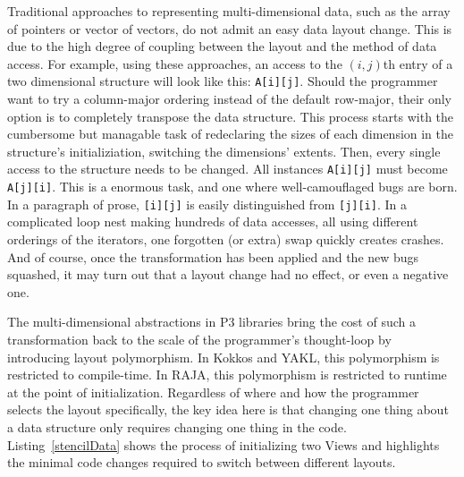 Traditional approaches to representing multi-dimensional data, such as the array of pointers or vector of vectors, do not admit an easy data layout change.
This is due to the high degree of coupling between the layout and the method of data access. 
For example, using these approaches, an access to the $(i,j)$th entry of a two dimensional structure will look like this: \verb.A[i][j]..
Should the programmer want to try a column-major ordering instead of the default row-major, their only option is to completely transpose the data structure.
This process starts with the cumbersome but managable task of redeclaring the sizes of each dimension in the structure's initializiation, switching the dimensions' extents.
Then, every single access to the structure needs to be changed. 
All instances \verb.A[i][j]. must become \verb.A[j][i]..
This is a enormous task, and one where well-camouflaged bugs are born. 
In a paragraph of prose, \verb.[i][j]. is easily distinguished from \verb.[j][i]..
In a complicated loop nest making hundreds of data accesses, all using different orderings of the iterators, one forgotten (or extra) swap quickly creates crashes.
And of course, once the transformation has been applied and the new bugs squashed, it may turn out that a layout change had no effect, or even a negative one.

The multi-dimensional abstractions in P3 libraries bring the cost of such a transformation back to the scale of the programmer's thought-loop by introducing layout polymorphism.
In Kokkos and YAKL, this polymorphism is restricted to compile-time.
In RAJA, this polymorphism is restricted to runtime at the point of initialization.
Regardless of where and how the programmer selects the layout specifically, the key idea here is that changing one thing about a data structure only requires changing one thing in the code.
Listing~\ref{stencilData} shows the process of initializing two Views and highlights the minimal code changes required to switch between different layouts.

